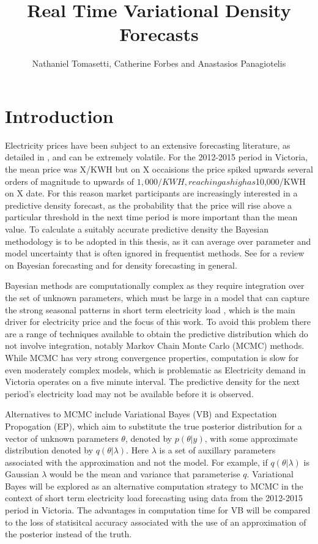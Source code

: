 \documentclass[12pt,a4paper]{article}%
\title{Real Time Variational Density Forecasts}
\author{Nathaniel Tomasetti, Catherine Forbes and Anastasios Panagiotelis}
\numberwithin{equation}{section}
\begin{document}
\maketitle
\tableofcontents
\section{Introduction} 

Electricity prices have been subject to an extensive forecasting literature, as detailed in \citet{Weron2014}, and can be extremely volatile. For the 2012-2015 period in Victoria, the mean price was X/KWH but on X occaisions the price spiked upwards several orders of magnitude to upwards of $1,000/KWH, reaching as high as $10,000/KWH on X date. For this reason market participants are increasingly interested in a predictive density forecast, as the probability that the price will rise above a particular threshold in the next time period is more important than the mean value. To calculate a suitably accurate predictive density the Bayesian methodology is to be adopted in this thesis, as it can average over parameter and model uncertainty that is often ignored in frequentist methods. See \citet{Geweke2006} for a review on Bayesian forecasting and \citet{Gneiting2014} for density forecasting in general. 

Bayesian methods are computationally complex as they require integration over the set of unknown parameters, which must be large in a model that can capture the strong seasonal patterns in short term electricity load \citep{Taylor2003}, which is the main driver for electricity price and the focus of this work. To avoid this problem there are a range of techniques available to obtain the predictive distribution which do not involve integration, notably Markov Chain Monte Carlo (MCMC) methods. While MCMC has very strong convergence properties, computation is slow for even moderately complex models, which is problematic as Electricity demand in Victoria operates on a five minute interval. The predictive density for the next period's electricity load may not be available before it is observed.

Alternatives to MCMC include Variational Bayes (VB) and Expectation Propogation (EP), which aim to substitute the true posterior distribution for a vector of unknown parameters $\theta$, denoted by $p(\theta | y)$, with some approximate distribution denoted by $q(\theta | \lambda)$. Here $\lambda$ is a set of auxillary parameters associated with the approximation and not the model. For example, if $q(\theta | \lambda)$ is Gaussian $\lambda$ would be the mean and variance that parameterise $q$. Variational Bayes will be explored as an alternative computation strategy to MCMC in the context of short term electricity load forecasting using data from the 2012-2015 period in Victoria. The advantages in computation time for VB will be compared to the loss of statisitcal accuracy associated with the use of an approximation of the posterior instead of the truth. 
\end{document}
